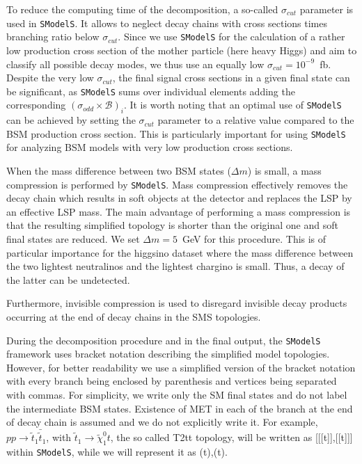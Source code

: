 \documentclass[11pt,a4paper]{article}
\begin{document}
To reduce the computing time of the decomposition, a so-called $\sigma_{cut}$ parameter is used in \texttt{SModelS}. It allows to neglect decay chains with cross sections times branching ratio below $\sigma_{cut}$. Since we use \texttt{SModelS} for the calculation of a rather low production cross section of the mother particle (here heavy Higgs) and aim to classify all possible decay modes, we thus use an equally low $\sigma_{cut} = 10^{-9}$~fb. Despite the very low $\sigma_{cut}$, the final signal cross sections in a given final state can be significant, as \texttt{SModelS} sums over individual elements adding the corresponding $(\sigma_{odd}\times \mathcal{B})_i$. It is worth noting that an optimal use of \texttt{SModelS} can be achieved by setting the $\sigma_{cut}$ parameter to a relative value compared to the BSM production cross section. This is particularly important for using \texttt{SModelS} for analyzing BSM models with very low production cross sections.

When the mass difference between two BSM states ($\Delta m$) is small, a mass compression is performed by \texttt{SModelS}. Mass compression effectively removes the decay chain which results in soft objects at the detector and replaces the LSP by an effective LSP mass. The main advantage of performing a mass compression is that the resulting simplified topology is shorter than the original one and soft final states are reduced. We set $\Delta m = 5$~GeV for this procedure. This is of particular importance for the higgsino dataset where the mass difference between the two lightest neutralinos and the lightest chargino is small. Thus, a decay of the latter can be undetected.

Furthermore, invisible compression is used to disregard invisible decay products occurring at the end of  decay chains in the SMS topologies. 

During the decomposition procedure and in the final output, the \texttt{SModelS} framework uses bracket notation describing the simplified model topologies. However, for better readability we use a simplified version of the bracket notation with every branch being enclosed by parenthesis and vertices being separated with commas. For simplicity, we write only the SM final states and do not label the intermediate BSM states. Existence of MET in each of the branch at the end of decay chain is assumed and we do not explicitly write it. For example, $p p \rightarrow \tilde t_1 \bar{\tilde t}_1$, with $\tilde t_1\rightarrow \tilde\chi^0_1 t$, the so called T2tt topology, will be written as [[[t]],[[t]]] within \texttt{SModelS}, while we will represent it as (t),(t). 
\end{document}
